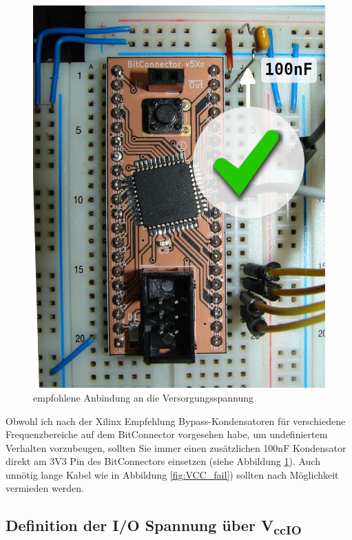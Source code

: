 \documentclass{article}
\begin{document}
{\begin{figure}[!h]
\begin{minipage}[!b]{.45\linewidth}
		\includegraphics[width=\linewidth]{Board_Vcc_correct}
		\caption{empfohlene Anbindung an die Versorgungsspannung}
		\label{fig:VCC_ok}
	\end{minipage}
\end{figure}

Obwohl ich nach der Xilinx Empfehlung \autocite{JTAG_Checklist} Bypass-Kondensatoren für verschiedene Frequenzbereiche auf dem BitConnector vorgesehen habe, um undefiniertem Verhalten vorzubeugen, sollten Sie immer einen zusätzlichen 100nF Kondensator direkt am 3V3 Pin des BitConnectors einsetzen (siehe Abbildung \ref{fig:VCC_ok}). Auch unnötig lange Kabel wie in Abbildung \ref{fig:VCC_fail}) sollten nach Möglichkeit vermieden werden.

\subsection{Definition der I/O Spannung über V\textsubscript{ccIO}}

}
\end{document}
